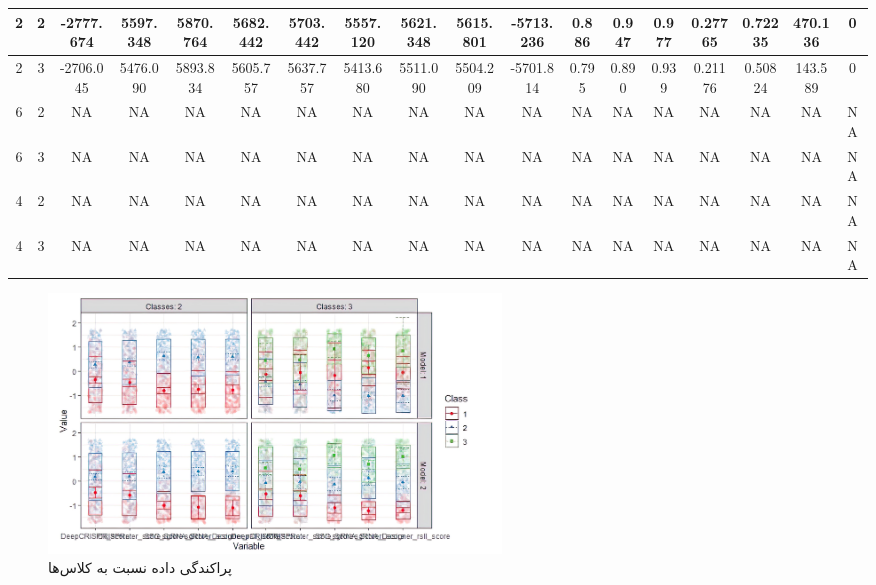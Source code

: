 \documentclass[12pt,a4paper,BCOR=.7cm,headsepline,bibliography=totoc]{report}
\begin{document}
\begin{table}[H]
\begin{latin}
\begin{adjustbox}{center}
{\begin{tabularx}{1.796\textwidth}{|c|c|c|c|c|c|c|c|c|c|c|c|c|c|c|c|c|c|}
2 & 2 & -2777.674 & 5597.348 & 5870.764 & 5682.442 & 5703.442 & 5557.120 & 5621.348 & 5615.801 & -5713.236 & 0.886 & 0.947 & 0.977 & 0.27765 & 0.72235 & 470.136 & 0  \\ \hline
2 & 3 & -2706.045 & 5476.090 & 5893.834 & 5605.757 & 5637.757 & 5413.680 & 5511.090 & 5504.209 & -5701.814 & 0.795 & 0.890 & 0.939 & 0.21176 & 0.50824 & 143.589 & 0 \\ \hline
6 & 2 & {\color{gray} NA} & {\color{gray} NA} & {\color{gray} NA} & {\color{gray} NA} &{\color{gray} NA} & {\color{gray} NA} & {\color{gray} NA} & {\color{gray} NA} & {\color{gray} NA} & {\color{gray} NA} & {\color{gray} NA} & {\color{gray} NA} & {\color{gray} NA} & {\color{gray} NA} & {\color{gray} NA} & {\color{gray} NA} \\ \hline
6 & 3 & {\color{gray} NA} & {\color{gray} NA} & {\color{gray} NA} & {\color{gray} NA} &{\color{gray} NA} & {\color{gray} NA} & {\color{gray} NA} & {\color{gray} NA} & {\color{gray} NA} & {\color{gray} NA} & {\color{gray} NA} & {\color{gray} NA} & {\color{gray} NA} & {\color{gray} NA} & {\color{gray} NA} & {\color{gray} NA} \\ \hline
4 & 2 & {\color{gray} NA} & {\color{gray} NA} & {\color{gray} NA} & {\color{gray} NA} &{\color{gray} NA} & {\color{gray} NA} & {\color{gray} NA} & {\color{gray} NA} & {\color{gray} NA} & {\color{gray} NA} & {\color{gray} NA} & {\color{gray} NA} & {\color{gray} NA} & {\color{gray} NA} & {\color{gray} NA} & {\color{gray} NA} \\ \hline
4 & 3 & {\color{gray} NA} & {\color{gray} NA} & {\color{gray} NA} & {\color{gray} NA} &{\color{gray} NA} & {\color{gray} NA} & {\color{gray} NA} & {\color{gray} NA} & {\color{gray} NA} & {\color{gray} NA} & {\color{gray} NA} & {\color{gray} NA} & {\color{gray} NA} & {\color{gray} NA} & {\color{gray} NA} & {\color{gray} NA} \\ \hline
\end{tabularx}}
\end{adjustbox}
\end{latin}
\end{table}

\begin{figure}[H]
\centering
\includegraphics[width=12cm, ]{pictures/tidyLPA.jpg}
\caption{
پراکندگی داده نسبت به کلاس‌ها
}\label{wrap-fig:4}
\end{figure}
\end{document}
